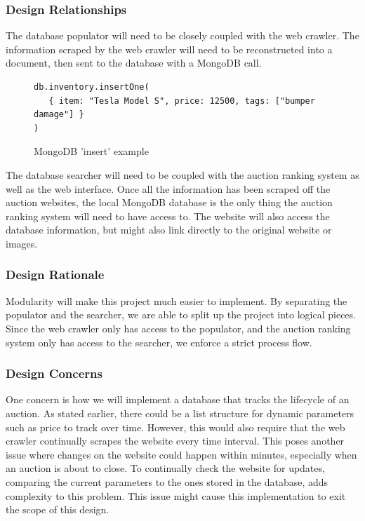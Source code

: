 \documentclass[onecolumn, draftclsnofoot, 10pt, compsoc]{IEEEtran}
\begin{document}
\subsubsection{Design Relationships}
The database populator will need to be closely coupled with the web crawler. The information scraped by the web crawler will need to be reconstructed into a document, then sent to the database with a MongoDB call.

\begin{figure}[ht]
\begin{lstlisting}
db.inventory.insertOne(
   { item: "Tesla Model S", price: 12500, tags: ["bumper damage"] }
)
\end{lstlisting}
\caption{MongoDB 'insert' example}
\end{figure}

The database searcher will need to be coupled with the auction ranking system as well as the web interface. Once all the information has been scraped off the auction websites, the local MongoDB database is the only thing the auction ranking system will need to have access to. The website will also access the database information, but might also link directly to the original website or images. 


\subsubsection{Design Rationale}
Modularity will make this project much easier to implement. By separating the populator and the searcher, we are able to split up the project into logical pieces. Since the web crawler only has access to the populator, and the auction ranking system only has access to the searcher, we enforce a strict process flow. 

\subsubsection{Design Concerns}
One concern is how we will implement a database that tracks the lifecycle of an auction. As stated earlier, there could be a list structure for dynamic parameters such as price to track over time. However, this would also require that the web crawler continually scrapes the website every time interval. This poses another issue where changes on the website could happen within minutes, especially when an auction is about to close. To continually check the website for updates, comparing the current parameters to the ones stored in the database, adds complexity to this problem. This issue might cause this implementation to exit the scope of this design. 
\end{document}
